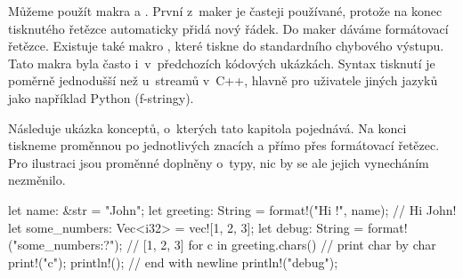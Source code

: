 \documentclass[main.tex]{subfiles}
\begin{document}

Můžeme použít makra  a . První z~maker je časteji
používané, protože na konec tisknutého řetězce automaticky přidá nový řádek. Do maker
dáváme formátovací řetězce. Existuje také makro , které tiskne do
standardního chybového výstupu. Tato makra byla často i~v~předchozích kódových ukázkách.
Syntax tisknutí je poměrně jednodušší než u~streamů v~C++, hlavně pro uživatele jiných
jazyků jako například Python (f-stringy).

Následuje ukázka konceptů, o~kterých tato kapitola pojednává. Na konci tiskneme proměnnou
 po jednotlivých znacích a  přímo přes formátovací řetězec.
Pro ilustraci jsou proměnné doplněny o~typy, nic by se ale jejich vynecháním nezměnilo.

\obrazek
\begin{rustcode}
    let name: &str = "John";
    let greeting: String = format!("Hi {}!", name); // Hi John!
    let some_numbers: Vec<i32> = vec![1, 2, 3];
    let debug: String = format!("{some_numbers:?}"); // [1, 2, 3]
    for c in greeting.chars() {
        // print char by char
        print!("{c}");
    }
    println!(); // end with newline
    println!("{debug}");
\end{rustcode}
\end{document}
